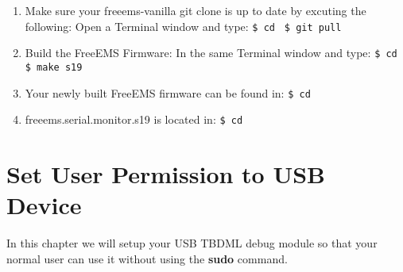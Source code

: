 \documentclass[12pt,notitlepage,onecolumn,oneside,openany]{memoir}
\begin{document}
\begin{enumerate}
\item \textsf{Make sure your freeems-vanilla git clone is up to date by excuting the following:} \newline
      \textsf{Open a Terminal window and type:} \newline
      \texttt{\$ cd }  \newline
      \texttt{\$ git pull}

\item \textsf{Build the FreeEMS Firmware:} \newline
      \textsf{In the same Terminal window and type:} \newline
      \texttt{\$ cd }  \newline
      \texttt{\$ make s19}

\item \textsf{Your newly built FreeEMS firmware can be found in:} \newline
      \texttt{\$ cd } 

\item \textsf{freeems.serial.monitor.s19 is located in:} \newline
      \texttt{\$ cd } 
\end{enumerate}

\chapter{\textsf{Set User Permission to USB Device}}

\textsf{In this chapter we will setup your USB TBDML debug module so that your normal user can use it without using the \textbf{sudo} command.} \newline
\end{document}
